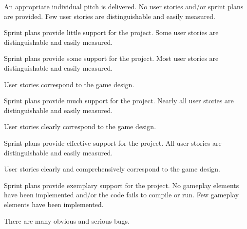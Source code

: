 \documentclass{../fal_assignment}
\begin{document}
\begin{markingrubric}
        \grade An appropriate individual pitch is delivered.
        \grade\fail No user stories and/or sprint plans are provided.
        \grade Few user stories are distinguishable and easily measured.
            \par Sprint plans provide little support for the project.
        \grade Some user stories are distinguishable and easily measured.
            \par Sprint plans provide some support for the project.
        \grade Most user stories are distinguishable and easily measured.
            \par User stories correspond to the game design.
            \par Sprint plans provide much support for the project.
        \grade Nearly all user stories are distinguishable and easily measured.
            \par User stories clearly correspond to the game design.
            \par Sprint plans provide effective support for the project.
        \grade All user stories are distinguishable and easily measured.
            \par User stories clearly and comprehensively correspond to the game design.
            \par Sprint plans provide exemplary support for the project.
        \grade\fail No gameplay elements have been implemented and/or the code fails to compile or run.
        \grade Few gameplay elements have been implemented.
            \par There are many obvious and serious bugs.

\end{markingrubric}
\end{document}

